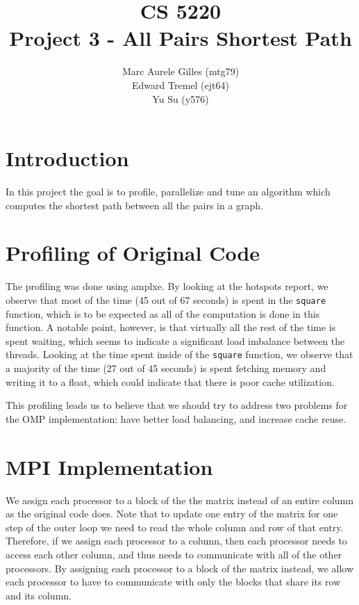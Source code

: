 \documentclass[11pt]{article}
\begin{document}
\title{CS 5220\\ Project 3 - All Pairs Shortest Path}
\author{Marc Aurele Gilles (mtg79)\\ Edward Tremel (ejt64) \\ Yu Su (y576)}
\maketitle

\section{Introduction}
In this project the goal is to profile, parallelize and tune an algorithm which computes the shortest path between all the pairs in a graph.


\section{Profiling of Original Code}
The profiling was done using amplxe. By looking at the hotspots report, we observe that most of the time (45 out of 67 seconds) is spent in the \texttt{square} function, which is to be expected as all of the computation is done in this function. A notable point, however, is that virtually all the rest of the time is spent waiting, which seems to indicate a significant load imbalance between the threads.
Looking at the time spent inside of the \texttt{square} function, we observe that a majority of the time (27 out of 45 seconds) is spent fetching memory and writing it to a float, which could indicate that there is poor cache utilization.

This profiling leads us to believe that we should try to address two problems for the OMP implementation: have better load balancing, and increase cache reuse.


 

\section{MPI Implementation}
We assign each processor to a block of the the matrix instead of an entire column as the original code does.
Note that to update one entry of the matrix for one step of the outer loop we need to read the whole column and row of that entry. Therefore, if we assign each processor to a column, then each processor needs to access each other column, and thus needs to communicate with all of the other processors. By assigning each processor to a block of the matrix instead, we allow each processor to have to communicate with only the blocks that share its row and its column.
\end{document}
